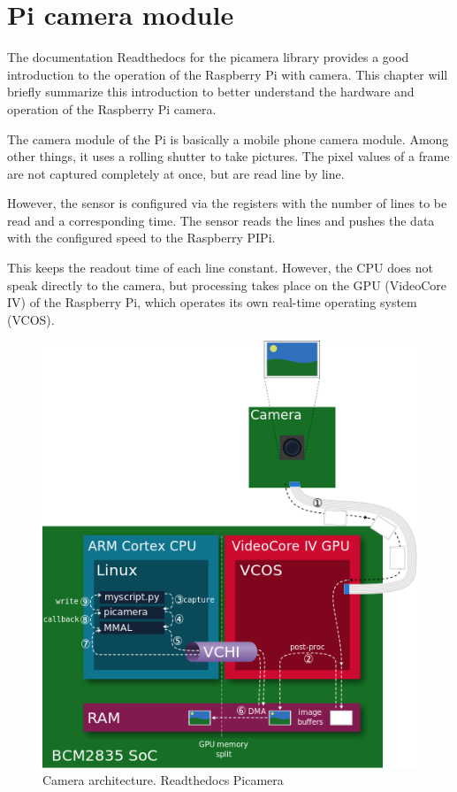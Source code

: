 \documentclass[12pt, a4paper]{report}
\begin{document}
    \section{Pi camera module}
    The documentation Readthedocs for the picamera library \cite{ReadTheDocsPicamera} provides a good introduction to the operation of the Raspberry Pi with camera. This chapter will briefly summarize this introduction to better understand the hardware and operation of the Raspberry Pi camera.
    
    The camera module of the Pi is basically a mobile phone camera module. Among other things, it uses a rolling shutter to take pictures. The pixel values of a frame are not captured completely at once, but are read line by line.
    
    However, the sensor is configured via the registers with the number of lines to be read and a corresponding time. The sensor reads the lines and pushes the data with the configured speed to the Raspberry PIPi.
    
    This keeps the readout time of each line constant. However, the CPU does not speak directly to the camera, but processing takes place on the GPU (VideoCore IV) of the Raspberry Pi, which operates its own real-time operating system (VCOS).
    
    \bigskip
    \noindent
    \begin{figure}[H]
    \centering
    \includegraphics[scale=0.7]{Images/camera_architecture.png}
    
    \caption{Camera architecture. Readthedocs Picamera}
    \end{figure}
    
\end{document}
